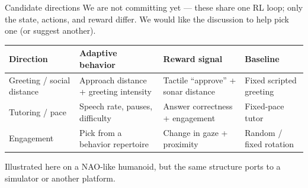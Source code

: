 \documentclass[aspectratio=169,10pt]{beamer}
\begin{document}
\begin{frame}{Candidate directions}
  \footnotesize We are not committing yet --- these share one RL loop; only the state, actions, and reward differ. We would like the discussion to help pick one (or suggest another).
  \begin{table}
    \begin{tabular}{@{}>{\raggedright\arraybackslash}p{2.4cm}>{\raggedright\arraybackslash}p{3.1cm}>{\raggedright\arraybackslash}p{3.0cm}>{\raggedright\arraybackslash}p{2.6cm}@{}}
      \toprule
      \textbf{Direction} & \textbf{Adaptive behavior} & \textbf{Reward signal} & \textbf{Baseline} \\
      \midrule
      Greeting / social distance & Approach distance + greeting intensity & Tactile ``approve'' + sonar distance & Fixed scripted greeting \\
      \addlinespace
      Tutoring / pace & Speech rate, pauses, difficulty & Answer correctness + engagement & Fixed-pace tutor \\
      \addlinespace
      Engagement & Pick from a behavior repertoire & Change in gaze + proximity & Random / fixed rotation \\
      \bottomrule
    \end{tabular}
  \end{table}
  \vspace{0.3em}
  {\footnotesize Illustrated here on a NAO-like humanoid, but the same structure ports to a simulator or another platform.}
\end{frame}
\end{document}
